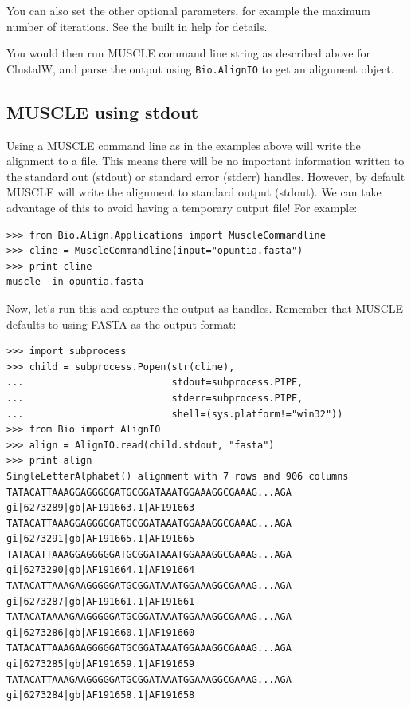 \documentclass{report}
\begin{document}
You can also set the other optional parameters, for example the maximum number
of iterations. See the built in help for details.

You would then run MUSCLE command line string as described above for
ClustalW, and parse the output using \verb|Bio.AlignIO| to get an
alignment object.

\subsection{MUSCLE using stdout}

Using a MUSCLE command line as in the examples above will write the alignment
to a file. This means there will be no important information written to the
standard out (stdout) or standard error (stderr) handles. However, by default
MUSCLE will write the alignment to standard output (stdout). We can take
advantage of this to avoid having a temporary output file! For example:

\begin{verbatim}
>>> from Bio.Align.Applications import MuscleCommandline
>>> cline = MuscleCommandline(input="opuntia.fasta")
>>> print cline
muscle -in opuntia.fasta
\end{verbatim}

\noindent Now, let's run this and capture the output as handles.
Remember that MUSCLE defaults to using FASTA as the output format:

\begin{verbatim}
>>> import subprocess
>>> child = subprocess.Popen(str(cline),
...                          stdout=subprocess.PIPE,
...                          stderr=subprocess.PIPE,
...                          shell=(sys.platform!="win32"))
>>> from Bio import AlignIO
>>> align = AlignIO.read(child.stdout, "fasta")
>>> print align
SingleLetterAlphabet() alignment with 7 rows and 906 columns
TATACATTAAAGGAGGGGGATGCGGATAAATGGAAAGGCGAAAG...AGA gi|6273289|gb|AF191663.1|AF191663
TATACATTAAAGGAGGGGGATGCGGATAAATGGAAAGGCGAAAG...AGA gi|6273291|gb|AF191665.1|AF191665
TATACATTAAAGGAGGGGGATGCGGATAAATGGAAAGGCGAAAG...AGA gi|6273290|gb|AF191664.1|AF191664
TATACATTAAAGAAGGGGGATGCGGATAAATGGAAAGGCGAAAG...AGA gi|6273287|gb|AF191661.1|AF191661
TATACATAAAAGAAGGGGGATGCGGATAAATGGAAAGGCGAAAG...AGA gi|6273286|gb|AF191660.1|AF191660
TATACATTAAAGAAGGGGGATGCGGATAAATGGAAAGGCGAAAG...AGA gi|6273285|gb|AF191659.1|AF191659
TATACATTAAAGAAGGGGGATGCGGATAAATGGAAAGGCGAAAG...AGA gi|6273284|gb|AF191658.1|AF191658
\end{verbatim}
\end{document}
